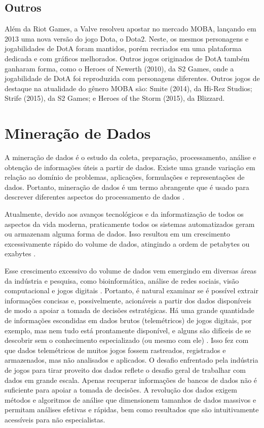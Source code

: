 \subsection{Outros}
Além da Riot Games, a Valve resolveu apostar no mercado MOBA, lançando em 2013 uma nova versão do jogo Dota, o Dota2. Neste, os mesmos personagens e jogabilidades de DotA foram mantidos, porém recriados em uma plataforma dedicada e com gráficos melhorados. Outros jogos originados de DotA também ganharam forma, como o Heroes of Newerth (2010), da S2 Games, onde a jogabilidade de DotA foi reproduzida com personagens diferentes. Outros jogos de destaque na atualidade do gênero MOBA são: Smite (2014), da Hi-Rez Studios; Strife (2015), da S2 Games; e Heroes of the Storm (2015), da Blizzard.

\section{Mineração de Dados}
A mineração de dados é o estudo da coleta, preparação, processamento, análise e obtenção de informações úteis a partir de dados. Existe uma grande variação em relação ao domínio de problemas, aplicações, formulações e representações de dados. Portanto, mineração de dados é um termo abrangente que é usado para descrever diferentes aspectos do processamento de dados \cite{aggarwal2015data}.

Atualmente, devido aos avanços tecnológicos e da informatização de todos os aspectos da vida moderna, praticamente todos os sistemas automatizados geram ou armazenam alguma forma de dados. Isso resultou em um crescimento excessivamente rápido do volume de dados, atingindo a ordem de petabytes ou exabytes \cite{aggarwal2015data}.

Esse crescimento excessivo do volume de dados vem emergindo em diversas áreas da indústria e pesquisa, como bioinformática, análise de redes sociais, visão computacional e jogos digitais \cite{el2016game}. Portanto, é natural examinar se é possível extrair informações concisas e, possivelmente, acionáveis a partir dos dados disponíveis de modo a apoiar a tomada de decisões estratégicas. Há uma grande quantidade de informações escondidas em dados brutos (telemétricos) de jogos digitais, por exemplo, mas nem tudo está prontamente disponível, e alguns são difíceis de se descobrir sem o conhecimento especializado (ou mesmo com ele) \cite{el2016game}. Isso fez com que dados telemétricos de muitos jogos fossem rastreados, registrados e armazenados, mas não analisados e aplicados. O desafio enfrentado pela indústria de jogos para tirar proveito dos dados reflete o desafio geral de trabalhar com dados em grande escala. Apenas recuperar informações de bancos de dados não é suficiente para apoiar a tomada de decisões. A revolução dos dados exigem métodos e algoritmos de análise que dimensionem tamanhos de dados massivos e permitam análises efetivas e rápidas, bem como resultados que são intuitivamente acessíveis para não especialistas.

